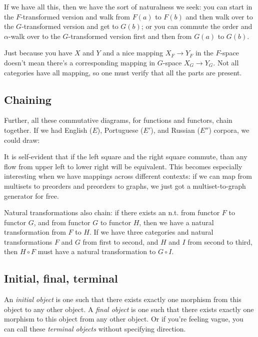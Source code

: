\documentclass[11pt]{article}
\begin{document}
If we have all this, then we have the sort of naturalness we seek: you can
start in the $F$-transformed version and walk from $F(a)$ to $F(b)$ and then walk over to
the $G$-transformed version and get to $G(b)$; or you can commute the order and
$\alpha$-walk over to the $G$-transformed version first and then from $G(a)$ to $G(b)$.

Just because you have $X$ and $Y$ and a nice mapping $X_F\to Y_F$ in the $F$-space doesn't mean there's a corresponding 
mapping in $G$-space $X_G\to Y_G$.
Not all categories have all mapping, so one must verify that all the parts are present.

\subsection{Chaining}
Further, all these commutative diagrams, for functions and functors, chain together. If
we had English ($E$), Portuguese ($E'$), and Russian  ($E''$) corpora, we could draw:


It is self-evident that if the left square and the right square commute, than any flow
from upper left to lower right will be equivalent. This becomes especially interesting
when we have mappings across different contexts: if we can map from multisets to preorders
and preorders to graphs, we just got a multiset-to-graph generator for free.

Natural transformations also chain: if there exists an n.t. from functor $F$ to functor
$G$, and from functor $G$ to functor $H$, then we have a natural transformation from $F$
to $H$. If we have three categories and natural transformations $F$ and $G$ from first to
second, and $H$ and $I$ from second to third, then $H\circ F$ must have a natural
transformation to $G\circ I$.

\subsection{Initial, final, terminal}
An {\em initial object} is one such that there exists exactly one morphism from this object to any other object.
A {\em final object} is one such that there exists exactly one morphism to this object from any other object.
Or if you're feeling vague, you can call these {\em terminal objects} without specifying direction.
\end{document}
